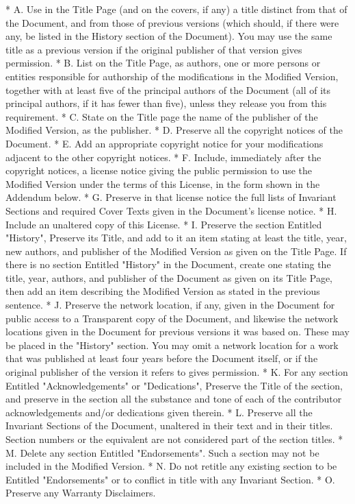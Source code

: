     * A. Use in the Title Page (and on the covers, if any) a title distinct from that of the Document, and from those of previous versions (which should, if there were any, be listed in the History section of the Document). You may use the same title as a previous version if the original publisher of that version gives permission.
    * B. List on the Title Page, as authors, one or more persons or entities responsible for authorship of the modifications in the Modified Version, together with at least five of the principal authors of the Document (all of its principal authors, if it has fewer than five), unless they release you from this requirement.
    * C. State on the Title page the name of the publisher of the Modified Version, as the publisher.
    * D. Preserve all the copyright notices of the Document.
    * E. Add an appropriate copyright notice for your modifications adjacent to the other copyright notices.
    * F. Include, immediately after the copyright notices, a license notice giving the public permission to use the Modified Version under the terms of this License, in the form shown in the Addendum below.
    * G. Preserve in that license notice the full lists of Invariant Sections and required Cover Texts given in the Document's license notice.
    * H. Include an unaltered copy of this License.
    * I. Preserve the section Entitled "History", Preserve its Title, and add to it an item stating at least the title, year, new authors, and publisher of the Modified Version as given on the Title Page. If there is no section Entitled "History" in the Document, create one stating the title, year, authors, and publisher of the Document as given on its Title Page, then add an item describing the Modified Version as stated in the previous sentence.
    * J. Preserve the network location, if any, given in the Document for public access to a Transparent copy of the Document, and likewise the network locations given in the Document for previous versions it was based on. These may be placed in the "History" section. You may omit a network location for a work that was published at least four years before the Document itself, or if the original publisher of the version it refers to gives permission.
    * K. For any section Entitled "Acknowledgements" or "Dedications", Preserve the Title of the section, and preserve in the section all the substance and tone of each of the contributor acknowledgements and/or dedications given therein.
    * L. Preserve all the Invariant Sections of the Document, unaltered in their text and in their titles. Section numbers or the equivalent are not considered part of the section titles.
    * M. Delete any section Entitled "Endorsements". Such a section may not be included in the Modified Version.
    * N. Do not retitle any existing section to be Entitled "Endorsements" or to conflict in title with any Invariant Section.
    * O. Preserve any Warranty Disclaimers. 

